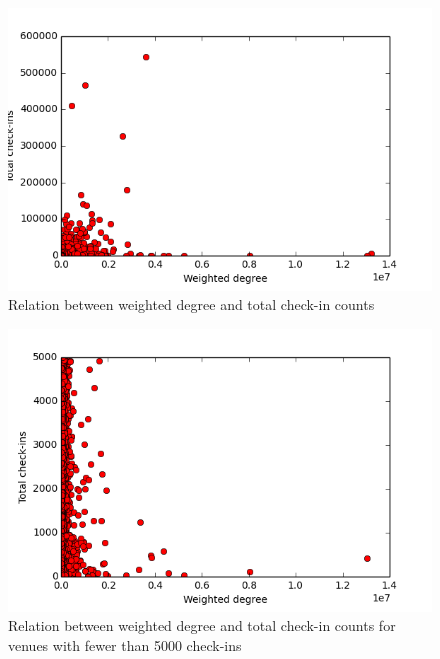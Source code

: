 \begin{figure}
\centering
\includegraphics[scale=0.5]{../rel_pop.png}
\caption{Relation between weighted degree and total check-in counts}
\label{fig:rel-pop}
\end{figure}
\begin{figure}
\centering
\includegraphics[scale=0.5]{../rel_pop_5000.png}
\caption{Relation between weighted degree and total check-in counts for venues with fewer than 5000 check-ins}
\label{fig:rel-pop-zoomed-in}
\end{figure}


